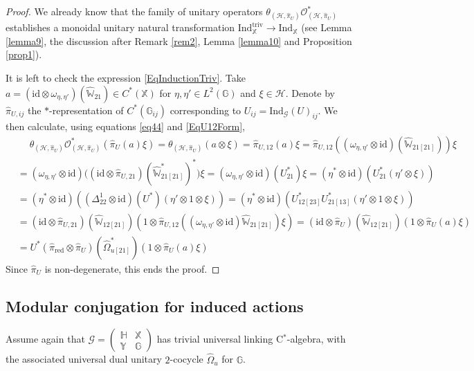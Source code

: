 \documentclass[reqno]{amsart}
\numberwithin{equation}{section}
\newcommand{\id}{\mathrm{id}}
\newcommand{\G}{\mathbb{G}}
\newcommand{\Hh}{\mathbb{H}}
\newcommand{\X}{\mathbb{X}}
\newcommand{\Y}{\mathbb{Y}}
\newcommand{\msG}{\mathscr{G}}
\newcommand{\Ind}{\mathrm{Ind}}
\newcommand{\red}{\mathrm{red}}
\newcommand{\triv}{\mathrm{triv}}
\newcommand{\mc}{\mathcal}
\newcommand{\GG}{\mathbb{G}}
\newcommand{\Ww}{\mathds{W}}
\begin{document}
\begin{proof}
We already know that the family of unitary operators $\theta_{(\mc{H},\hat{\pi}_U)}\mc{O}^*_{(\mc{H},\hat{\pi}_U)}$ establishes a monoidal unitary natural transformation $\Ind_{\X}^{\triv}\rightarrow \Ind_{\X}$ (see Lemma \ref{lemma9}, the discussion after Remark \ref{rem2}, Lemma \ref{lemma10} and  Proposition \ref{prop1}).

It is left to check the expression \eqref{EqInductionTriv}. Take $a=(\id\otimes\omega_{\eta,\eta'})(\hat{\Ww}_{21})\in C^*(\X)$ for $\eta,\eta'\in L^2(\GG)$ and $\xi\in \mc{H}$. Denote by $\hat{\pi}_{U,ij}$ the $*$-representation of $C^*(\GG_{ij})$ corresponding to $U_{ij}=\Ind_{\msG}(U)_{ij}$. We then calculate, using equations \eqref{eq44} and \eqref{EqU12Form},
\[\begin{split}
&\quad\;
\theta_{(\mc{H},\hat{\pi}_U)}\mc{O}^*_{(\mc{H},\hat{\pi}_U)} (\hat{\pi}_U(a) \xi)=
\theta_{(\mc{H},\hat{\pi}_U)}(a\otimes \xi)=
\hat{\pi}_{U,12}(a)\xi=
\hat{\pi}_{U,12}((\omega_{\eta,\eta'}\otimes\id)(\hat{\Ww}_{21 [21]}))\xi\\
&=
(\omega_{\eta,\eta'}\otimes\id)
\bigl( (\id\otimes\hat{\pi}_{U,21})(\hat{\Ww}_{21[21]}^*)^*\bigr)
\xi=
(\omega_{\eta,\eta'}\otimes\id)(U_{21}^*)\xi=
( \eta^* \otimes \id)(U_{21}^*(\eta'\otimes \xi))\\
&=
( \eta^* \otimes \id)(
(\Delta^1_{22}\otimes \id)(U^*)
(\eta'\otimes 1 \otimes \xi ))=
( \eta^* \otimes \id)(
U_{12 [23]}^*U_{21 [13]}^* 
(\eta'\otimes 1 \otimes \xi ))\\
&=
(\id\otimes \hat{\pi}_{U, 21})(\hat{\Ww}_{12 [21]})
(1\otimes \hat{\pi}_{U, 12}( (\omega_{\eta,\eta'}\otimes\id)\hat{\Ww}_{21[21]})\xi)=
(\id\otimes \hat{\pi}_{U})(\hat{\Ww}_{12 [21]})
(1\otimes \hat{\pi}_{U}(a)\xi)\\
&=
U^* (\hat{\pi}_{\red}\otimes \hat{\pi}_U)(\hat{\Omega}^*_{u[21]})
(1\otimes \hat{\pi}_{U}(a)\xi)
\end{split}\]
Since $\hat{\pi}_U$ is non-degenerate, this ends the proof. 
\end{proof}


\subsection{Modular conjugation for induced actions}
Assume again that $\msG = \begin{pmatrix} \Hh & \X\\ \Y & \G\end{pmatrix}$ has trivial universal linking C$^*$-algebra, with the associated universal dual unitary $2$-cocycle $\hat{\Omega}_u$ for $\G$. 
\end{document}
